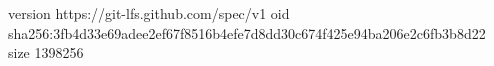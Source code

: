 version https://git-lfs.github.com/spec/v1
oid sha256:3fb4d33e69adee2ef67f8516b4efe7d8dd30c674f425e94ba206e2c6fb3b8d22
size 1398256
